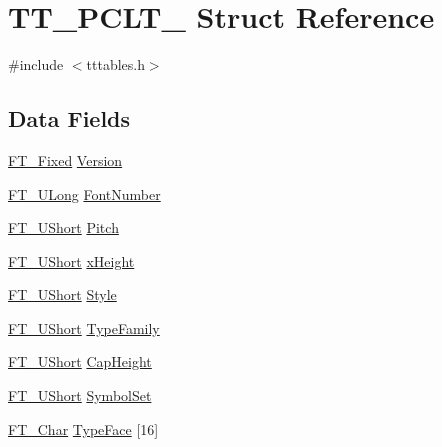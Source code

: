 \hypertarget{struct_t_t___p_c_l_t__}{}\section{T\+T\+\_\+\+P\+C\+L\+T\+\_\+ Struct Reference}
\label{struct_t_t___p_c_l_t__}


{\ttfamily \#include $<$tttables.\+h$>$}

\subsection*{Data Fields}
\begin{DoxyCompactItemize}
\item 
\hyperlink{fttypes_8h_a5f5a679cc09f758efdd0d1c5feed3c3d}{F\+T\+\_\+\+Fixed} \hyperlink{struct_t_t___p_c_l_t___a83429ca782a731b38d67e604809e278c}{Version}
\item 
\hyperlink{fttypes_8h_a4fac88bdba78eb76b505efa6e4fbf3f5}{F\+T\+\_\+\+U\+Long} \hyperlink{struct_t_t___p_c_l_t___a1465aa1ea82df2be913eb64498fe3d94}{Font\+Number}
\item 
\hyperlink{fttypes_8h_a937f6c17cf5ffd09086d8610c37b9f58}{F\+T\+\_\+\+U\+Short} \hyperlink{struct_t_t___p_c_l_t___ae8134f929d7a259c081fe28e9b5cf53d}{Pitch}
\item 
\hyperlink{fttypes_8h_a937f6c17cf5ffd09086d8610c37b9f58}{F\+T\+\_\+\+U\+Short} \hyperlink{struct_t_t___p_c_l_t___a4b2f3e6bf6508eacbff5e4eb16745872}{x\+Height}
\item 
\hyperlink{fttypes_8h_a937f6c17cf5ffd09086d8610c37b9f58}{F\+T\+\_\+\+U\+Short} \hyperlink{struct_t_t___p_c_l_t___a8e99588c1d255e28aa3c59600d5ae7bd}{Style}
\item 
\hyperlink{fttypes_8h_a937f6c17cf5ffd09086d8610c37b9f58}{F\+T\+\_\+\+U\+Short} \hyperlink{struct_t_t___p_c_l_t___a9bb9ac1b782e03002ecb99de08af7935}{Type\+Family}
\item 
\hyperlink{fttypes_8h_a937f6c17cf5ffd09086d8610c37b9f58}{F\+T\+\_\+\+U\+Short} \hyperlink{struct_t_t___p_c_l_t___a754d840e5bcf6011459de635aa38d728}{Cap\+Height}
\item 
\hyperlink{fttypes_8h_a937f6c17cf5ffd09086d8610c37b9f58}{F\+T\+\_\+\+U\+Short} \hyperlink{struct_t_t___p_c_l_t___ad4eeb575ecd624d4540275981e96a336}{Symbol\+Set}
\item 
\hyperlink{fttypes_8h_a0f851552b050883885f0a0855771f39d}{F\+T\+\_\+\+Char} \hyperlink{struct_t_t___p_c_l_t___a47c2c6b276f3ab2002fe03af41dad396}{Type\+Face} \mbox{[}16\mbox{]}
\item 

\end{DoxyCompactItemize}
